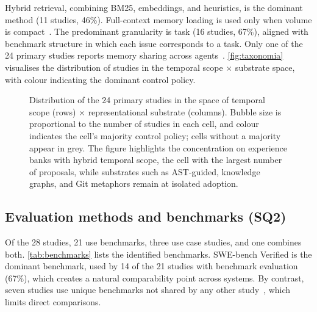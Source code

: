 Hybrid retrieval, combining BM25, embeddings, and heuristics, is the
dominant method (11 studies, 46\%).
Full-context memory loading is used only when volume is
compact~\citep{xia2025livesweagent,zhang2025accelopt}.
The predominant granularity is task (16 studies, 67\%), aligned with
benchmark structure in which each issue corresponds to a task.
Only one of the 24 primary studies reports memory sharing across
agents~\citep{chen2025sweexp}.
\autoref{fig:taxonomia} visualises the distribution of studies in the
temporal scope $\times$ substrate space, with colour indicating the
dominant control policy.

\begin{figure}[!htbp]
  \centering
  \resizebox{\textwidth}{!}{}
  \caption{Distribution of the 24 primary studies in the space of
    temporal scope (rows) $\times$ representational substrate
    (columns).
    Bubble size is proportional to the number of studies in each
    cell, and colour indicates the cell's majority control policy;
    cells without a majority appear in grey.
    The figure highlights the concentration on experience banks
    with hybrid temporal scope, the cell with the largest number
    of proposals, while substrates such as AST-guided, knowledge
    graphs, and Git metaphors remain at isolated adoption.}
  \label{fig:taxonomia}
\end{figure}

\FloatBarrier
\subsection{Evaluation methods and benchmarks (SQ2)}
\label{sec:qs2}

Of the 28 studies, 21 use benchmarks, three use case studies, and one
combines both.
\autoref{tab:benchmarks} lists the identified benchmarks.
SWE-bench Verified is the dominant benchmark, used by 14 of the 21
studies with benchmark evaluation (67\%), which creates a natural
comparability point across systems.
By contrast, seven studies use unique benchmarks not shared by any other
study~\citep{deshpande2025memtrack,dong2026kernelblaster,qian2024iterative,tablan2025smarter,zhang2025accelopt,nadafian2026kapso,wang2026codemem},
which limits direct comparisons.

